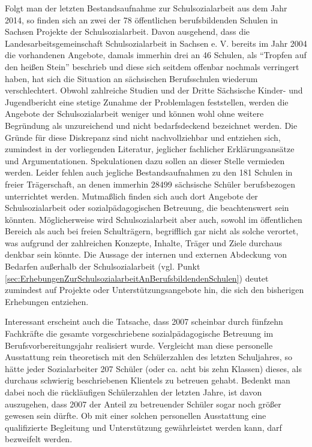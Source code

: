 Folgt man der letzten Bestandsaufnahme zur Schulsozialarbeit aus dem Jahr 2014, so finden sich an zwei der 78 öffentlichen berufsbildenden Schulen in Sachsen Projekte der Schulsozialarbeit. Davon ausgehend, dass die Landesarbeitsgemeinschaft Schulsozialarbeit in Sachsen e. V. bereits im Jahr 2004 die vorhandenen Angebote, damals immerhin drei an 46 Schulen, als "`Tropfen auf den heißen Stein"' beschrieb und diese sich seitdem offenbar nochmals verringert haben, hat sich die Situation an sächsischen Berufsschulen wiederum verschlechtert. Obwohl zahlreiche Studien und der Dritte Sächsische Kinder- und Jugendbericht eine stetige Zunahme der Problemlagen feststellen, werden die Angebote der Schulsozialarbeit weniger und können wohl ohne weitere Begründung als unzureichend und nicht bedarfsdeckend bezeichnet werden. Die Gründe für diese Diskrepanz sind nicht nachvollziehbar und entziehen sich, zumindest in der vorliegenden Literatur, jeglicher fachlicher Erklärungsansätze und Argumentationen. Spekulationen dazu sollen an dieser Stelle vermieden werden. Leider fehlen auch jegliche Bestandsaufnahmen zu den 181 Schulen in freier Trägerschaft, an denen immerhin 28499 sächsische Schüler berufsbezogen unterrichtet werden. Mutmaßlich finden sich auch dort Angebote der Schulsozialarbeit oder sozialpädagogischen Betreuung, die beachtenswert sein könnten. Möglicherweise wird Schulsozialarbeit aber auch, sowohl im öffentlichen Bereich als auch bei freien Schulträgern, begrifflich gar nicht als solche verortet, was aufgrund der zahlreichen Konzepte, Inhalte, Träger und Ziele durchaus denkbar sein könnte. Die Aussage der internen und externen Abdeckung von Bedarfen außerhalb der Schulsozialarbeit (vgl. Punkt \ref{sec:ErhebungenZurSchulsozialarbeitAnBerufsbildendenSchulen}) deutet zumindest auf Projekte oder Unterstützungsangebote hin, die sich den bisherigen Erhebungen entziehen. 

Interessant erscheint auch die Tatsache, dass 2007 scheinbar durch fünfzehn Fachkräfte die gesamte vorgeschriebene sozialpädagogische Betreuung im Berufsvorbereitungsjahr realisiert wurde. Vergleicht man diese personelle Ausstattung rein theoretisch mit den Schülerzahlen des letzten Schuljahres, so hätte jeder Sozialarbeiter 207 Schüler (oder ca. acht bis zehn Klassen) dieses, als durchaus schwierig beschriebenen Klientels zu betreuen gehabt. Bedenkt man dabei noch die rückläufigen Schülerzahlen der letzten Jahre, ist davon auszugehen, dass 2007 der Anteil zu betreuender Schüler sogar noch größer gewesen sein dürfte. Ob mit einer solchen personellen Ausstattung eine qualifizierte Begleitung und Unterstützung gewährleistet werden kann, darf bezweifelt werden.

